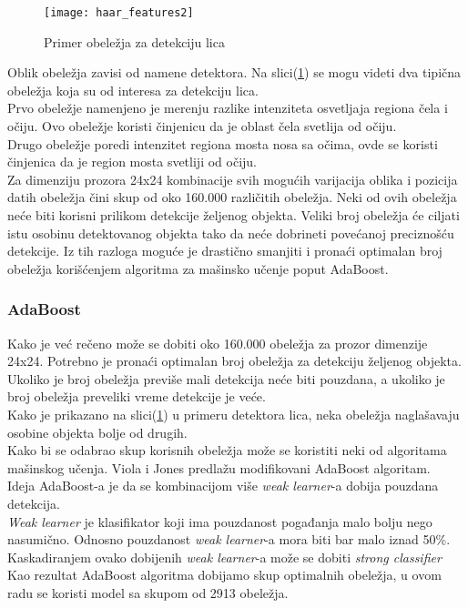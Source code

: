 \begin{figure}[H]
  \centering
  \texttt{[image: haar\_features2]}
  \caption{Primer obeležja za detekciju lica \cite{Viola2001RapidOD}}
  \label{haar_features_img2}
\end{figure}

Oblik obeležja zavisi od namene detektora.
Na slici(\ref{haar_features_img2}) se mogu videti dva tipična obeležja koja su od
interesa za detekciju lica. \\
Prvo obeležje namenjeno je merenju razlike intenziteta osvetljaja regiona čela i očiju.
Ovo obeležje koristi činjenicu da je oblast čela svetlija od očiju. \\
Drugo obeležje poredi intenzitet regiona mosta nosa sa očima, ovde se koristi
činjenica da je region mosta svetliji od očiju. \\

Za dimenziju prozora 24x24 kombinacije svih mogućih varijacija oblika i pozicija
datih obeležja čini skup od oko 160.000 različitih obeležja.
Neki od ovih obeležja neće biti korisni prilikom detekcije željenog objekta.
Veliki broj obeležja će ciljati istu osobinu detektovanog objekta tako da neće
dobrineti povećanoj preciznošću detekcije.
Iz tih razloga moguće je drastično smanjiti i pronaći optimalan broj obeležja
korišćenjem algoritma za mašinsko učenje poput AdaBoost. \\

\subsubsection{AdaBoost}

Kako je već rečeno može se dobiti oko 160.000 obeležja za prozor dimenzije
24x24.
Potrebno je pronaći optimalan broj obeležja za detekciju željenog objekta.
Ukoliko je broj obeležja previše mali detekcija neće biti pouzdana, a ukoliko je
broj obeležja preveliki vreme detekcije je veće. \\
Kako je prikazano na slici(\ref{haar_features_img2}) u primeru detektora lica,
neka obeležja naglašavaju osobine objekta bolje od drugih. \\

Kako bi se odabrao skup korisnih obeležja može se koristiti neki od algoritama
mašinskog učenja. Viola i Jones predlažu modifikovani AdaBoost algoritam. \\

Ideja AdaBoost-a je da se kombinacijom više \emph{weak learner}-a dobija
pouzdana detekcija. \\
\emph{Weak learner} je klasifikator koji ima pouzdanost pogađanja malo bolju
nego nasumično. Odnosno pouzdanost \emph{weak learner}-a mora biti bar malo
iznad 50\%. \\
Kaskadiranjem ovako dobijenih \emph{weak learner}-a može se dobiti \emph{strong
  classifier} \\
Kao rezultat AdaBoost algoritma dobijamo skup optimalnih obeležja, u ovom radu se koristi
model sa skupom od 2913 obeležja.

